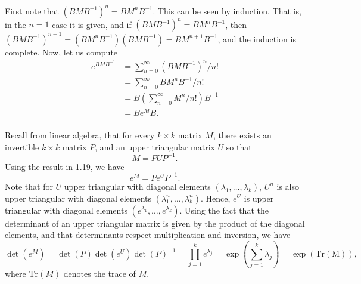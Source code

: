 \documentclass{homework}
\begin{document}
\begin{solution}
First note that $(BMB^{-1})^n = BM^nB^{-1}$. This can be seen by induction.  That is, in the $n=1$ case it is given, and if $(BMB^{-1})^n = BM^nB^{-1}$, then $(BMB^{-1})^{n+1} = (BM^nB^{-1})(BMB^{-1}) = BM^{n+1}B^{-1}$, and the induction is complete.  Now, let us compute
\begin{align*}
  e^{BMB^{-1}} 
  &= \sum_{n=0}^\infty (BMB^{-1})^n/n! \\
  &= \sum_{n=0}^\infty BM^nB^{-1}/n! \\
  &= B\left(\sum_{n=0}^\infty M^n/n!\right)B^{-1} \\
  &= Be^MB. \\
\end{align*}
\end{solution}

\begin{solution}
  Recall from linear algebra, that for every $k\times k$ matrix $M$, there exists an invertible $k\times k$ matrix $P$, and an upper triangular matrix $U$ so that 
  $$
    M = PUP^{-1}.
  $$
  Using the result in 1.19, we have
  $$
   e^M = Pe^{U}P^{-1}. 
  $$
  Note that for $U$ upper triangular with diagonal elements
  $(\lambda_1,\dots,\lambda_k)$, $U^n$ is also upper triangular with diagonal
  elements $(\lambda_1^n,\dots,\lambda_k^n)$. Hence, $e^U$ is upper triangular
  with diagonal elements $(e^{\lambda_1},\dots,e^{\lambda_k})$. Using the fact
  that the determinant of an upper triangular matrix is given by the product of
  the diagonal elements, and that determinants respect multiplication and
  inversion, we have
  $$
    \det(e^M) = \det(P)\det(e^U)\det(P)^{-1} = \prod_{j=1}^k e^{\lambda_j} = \exp\left(\sum_{j=1}^k \lambda_j\right) = \exp(\mathrm{Tr(M)}),
  $$
  where $\mathrm{Tr}(M)$ denotes the trace of $M$.
\end{solution}
\end{document}
